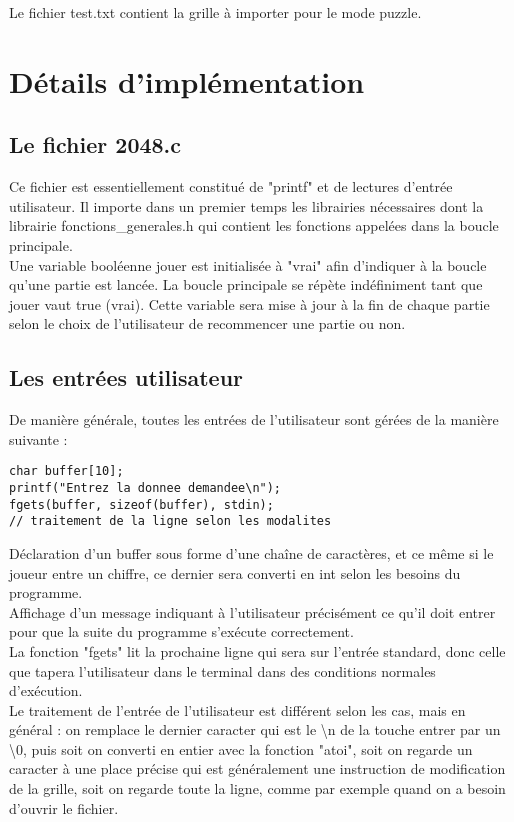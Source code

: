 \documentclass[12pt]{article}
\begin{document}
\indent Le fichier test.txt contient la grille à importer pour le mode puzzle.\\

\section{Détails d'implémentation}

\subsection{Le fichier 2048.c}

\indent Ce fichier est essentiellement constitué de "printf" et de lectures d'entrée utilisateur. Il importe dans un premier temps les librairies nécessaires dont la librairie fonctions\_generales.h qui contient les fonctions appelées dans la boucle principale.\\
\indent Une variable booléenne jouer est initialisée à "vrai" afin d'indiquer à la boucle qu'une partie est lancée. La boucle principale se répète indéfiniment tant que jouer vaut true (vrai). Cette variable sera mise à jour à la fin de chaque partie selon le choix de l'utilisateur de recommencer une partie ou non.

\subsection{Les entrées utilisateur}

\indent De manière générale, toutes les entrées de l'utilisateur sont gérées de la manière suivante : 
\begin{lstlisting}[style=mystyle, caption={code pour les entrées utilisateur}]
char buffer[10];
printf("Entrez la donnee demandee\n");
fgets(buffer, sizeof(buffer), stdin);
// traitement de la ligne selon les modalites
\end{lstlisting}

\indent * Déclaration d'un buffer sous forme d'une chaîne de caractères, et ce même si le joueur entre un chiffre, ce dernier sera converti en int selon les besoins du programme.\\
\indent * Affichage d'un message indiquant à l'utilisateur précisément ce qu'il doit entrer pour que la suite du programme s'exécute correctement.\\
\indent * La fonction "fgets" lit la prochaine ligne qui sera sur l'entrée standard, donc celle que tapera l'utilisateur dans le terminal dans des conditions normales d'exécution.\\
\indent * Le traitement de l'entrée de l'utilisateur est différent selon les cas, mais en général : on remplace le dernier caracter qui est le \textbackslash n de la touche entrer par un \textbackslash 0, puis soit on converti en entier avec la fonction "atoi", soit on regarde un caracter à une place précise qui est généralement une instruction de modification de la grille, soit on regarde toute la ligne, comme par exemple quand on a besoin d'ouvrir le fichier.
\end{document}
